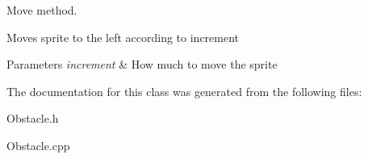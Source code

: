 Move method. 

Moves sprite to the left according to increment 
\begin{DoxyParams}{Parameters}
{\em increment} & How much to move the sprite \\
\hline
\end{DoxyParams}


The documentation for this class was generated from the following files\+:\begin{DoxyCompactItemize}
\item 
Obstacle.\+h\item 
Obstacle.\+cpp\end{DoxyCompactItemize}
